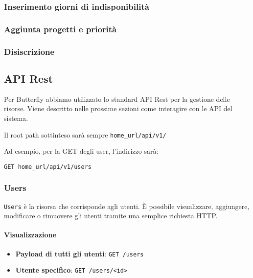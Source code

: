 \subsubsection{Inserimento giorni di indisponibilità}

\subsubsection{Aggiunta progetti e priorità}

\subsubsection{Disiscrizione}


\subsection{API Rest}\label{APIRest}

\newcommand{\homeUrl}{home\_url}

Per Butterfly abbiamo utilizzato lo standard API Rest per la gestione delle risorse.
Viene descritto nelle prossime sezioni come interagire con le API del sistema.

Il root path sottinteso sarà sempre \texttt{\homeUrl/api/v1/}

Ad esempio, per la GET degli user, l'indirizzo sarà:
\begin{center}
    \texttt{GET \homeUrl/api/v1/users}
\end{center}

\subsubsection{Users}

\texttt{Users} è la risorsa che corrisponde agli utenti.
È possibile visualizzare, aggiungere, modificare o rimuovere gli utenti tramite una semplice
richiesta HTTP.

\paragraph{Visualizzazione}

\begin{itemize}
    \item \textbf{Payload di tutti gli utenti}: \texttt{GET /users}
    \item \textbf{Utente specifico}: \texttt{GET /users/<id>}
\end{itemize}


